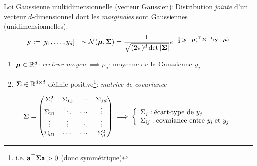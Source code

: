 \documentclass[xcolor=svgnames, t]{beamer}
\newcommand{\coloredemph}[1]{\textcolor{internationalblue}{\emph{#1}}}
\newcommand{\vectorx}[1]{\boldsymbol{\MakeLowercase{\mathbf{#1}}}}
\newcommand{\matrixx}[1]{\boldsymbol{\MakeUppercase{#1}}}
\begin{document}
\begin{frame}
  \frametitle{\secname}

  Loi Gaussienne multidimensionnelle (vecteur Gaussien): Distribution \coloredemph{jointe} d'un vecteur $d$-dimensionnel dont les \coloredemph{marginales} sont Gaussiennes (unidimensionnelles).
  \begin{equation*}
    \vectorx{Y} := [ y_1, \dots, y_d ]^\top  \sim \mathcal{N}(\vectorx{\mu} , \matrixx{\Sigma}) =  \frac{1}{\sqrt{(2 \pi)^d \det |\matrixx{\Sigma}|}} e^{-\frac{1}{2}(\vectorx{y - \mu})^\top \matrixx{\Sigma}^{-1} (\vectorx{y - \mu})}
  \end{equation*}
% 
  \begin{enumerate}
    \item $\vectorx{\mu} \in \mathbb{R}^d$: \coloredemph{vecteur moyen} $\implies \mu_j$: moyenne de la Gaussienne $y_j$
    \item $\matrixx{\Sigma} \in \mathbb{R}^{d \times d}$ définie positive\footnote{i.e. $\vectorx{a}^\top \matrixx{\Sigma} \vectorx{a} > 0$ (donc symmétrique)}: \coloredemph{matrice de covariance}
  \end{enumerate}
% 
  \pause
  \begin{equation*}
    \matrixx{\Sigma}
    =
    \begin{pmatrix} 
      \Sigma^2_{1}  & \Sigma_{{1}{2}} &  \cdots & \Sigma_{{1}{d}} \\
      \Sigma_{{2}{1}} & \ddots          & \cdots  & \vdots \\
      \vdots          & \vdots          & \ddots  & \vdots \\
      \Sigma_{{d}{1}} & \cdots          & \cdots  &  \Sigma^2_{d} 
      \end{pmatrix}
    \implies
    \left\{
      \begin{array}{ll}
        \Sigma_j  : \text{écart-type} \text{ de } y_j\\
        \Sigma_{ij} : \text{covariance entre } y_i \text{ et } y_j
      \end{array}
    \right.
  \end{equation*}

\end{frame}
\end{document}
